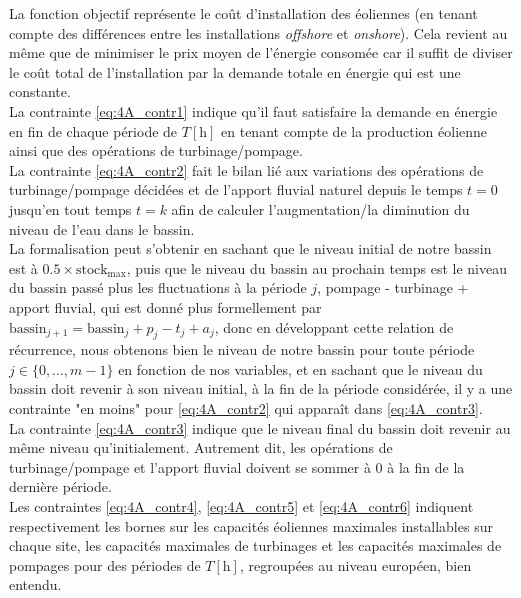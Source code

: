 \documentclass{article}
\newcommand{\unit}[1]{[\mathrm{#1}]}
\begin{document}
\newpage

La fonction objectif représente le coût d'installation des éoliennes (en tenant compte des différences entre les installations \textit{offshore} et \textit{onshore}). 
Cela revient au même que de minimiser le prix moyen de l'énergie consomée car il suffit de diviser le coût total de l'installation par la demande totale en énergie qui est une constante.\\
La contrainte \eqref{eq:4A_contr1} indique qu'il faut satisfaire la demande en énergie en fin de chaque période de $T \unit{h}$ en tenant compte de la production éolienne
ainsi que des opérations de turbinage/pompage.\\
La contrainte \eqref{eq:4A_contr2} fait le bilan lié aux variations des opérations de turbinage/pompage décidées et de l'apport fluvial naturel depuis le temps $t = 0$ jusqu'en tout temps $t = k$ afin de calculer l'augmentation/la diminution du niveau de l'eau dans le bassin.\\
La formalisation peut s'obtenir en sachant que le niveau initial de notre bassin est à $0.5 \times \mathrm{stock}_\mathrm{max}$, puis que le niveau du bassin au prochain temps est le niveau du bassin passé plus les fluctuations à la période $j$, pompage - turbinage + apport fluvial, qui est donné plus formellement par $\mathrm{bassin}_{j+1} = \mathrm{bassin}_{j} + p_j - t_j + a_j$, donc en développant cette relation de récurrence, nous obtenons 
bien le niveau de notre bassin pour toute période $j \in \{ 0, \ldots, m-1 \}$ en fonction de nos variables, et en sachant que le niveau du bassin doit revenir à son niveau initial, à la fin 
de la période considérée, il y a une contrainte "en moins" pour \eqref{eq:4A_contr2} qui apparaît dans \eqref{eq:4A_contr3}. \\
La contrainte \eqref{eq:4A_contr3} indique que le niveau final du bassin doit revenir au même niveau qu'initialement. Autrement dit, les opérations de turbinage/pompage et 
l'apport fluvial doivent se sommer à 0 à la fin de la dernière période.\\
Les contraintes \eqref{eq:4A_contr4}, \eqref{eq:4A_contr5} et \eqref{eq:4A_contr6} indiquent respectivement les bornes sur les capacités éoliennes maximales installables sur chaque site, 
les capacités maximales de turbinages et les capacités maximales de pompages pour des périodes de $T \unit{h}$, regroupées au niveau européen, bien entendu.

\newpage %
\end{document}
